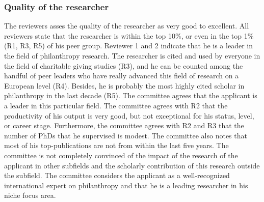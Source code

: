 \documentclass[twocolumn, serif, rga, numeric]{jote-article}
\begin{document}
\subsubsection{\textbf{Quality of the researcher}}
The reviewers asses the quality of the researcher as very good to excellent. All reviewers state that the researcher is within the top 10\%, or even in the top 1\% (R1, R3, R5) of his peer group. Reviewer 1 and 2 indicate that he is a leader in the field of philanthropy research. The researcher is cited and used by everyone in the field of charitable giving studies (R3), and he can be counted among the handful of peer leaders who have really advanced this field of research on a European level (R4). Besides, he is probably the most highly cited scholar in philanthropy in the last decade (R5). The committee agrees that the applicant is a leader in this particular field. The committee agrees with R2 that the productivity of his output is very good, but not exceptional for his status, level, or career stage. Furthermore, the committee agrees with R2 and R3 that the number of PhDs that he supervised is modest. The committee also notes that most of his top-publications are not from within the last five years. The committee is not completely convinced of the impact of the research of the applicant in other subfields and the scholarly contribution of this research outside the subfield. The committee considers the applicant as a well-recognized international expert on philanthropy and that he is a leading researcher in his niche focus area.
\end{document}
